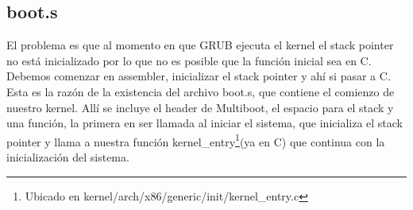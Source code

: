 \subsection[boot.s]{boot.s\protect\footnotemark{}\protect{}}
El problema es que al momento en que GRUB ejecuta el kernel el stack pointer no está inicializado por lo que no es posible que la función inicial sea en C. Debemos comenzar en assembler, inicializar el stack pointer y ahí si pasar a C. Esta es la razón de la existencia del archivo boot.s, que contiene el comienzo de nuestro kernel. Allí se incluye el header de Multiboot, el espacio para el stack y una función, la primera en ser llamada al iniciar el sistema, que inicializa el stack pointer y llama a nuestra función kernel\_entry\footnote{Ubicado en kernel/arch/x86/generic/init/kernel\_entry.c}(ya en C) que continua con la inicialización del sistema.
